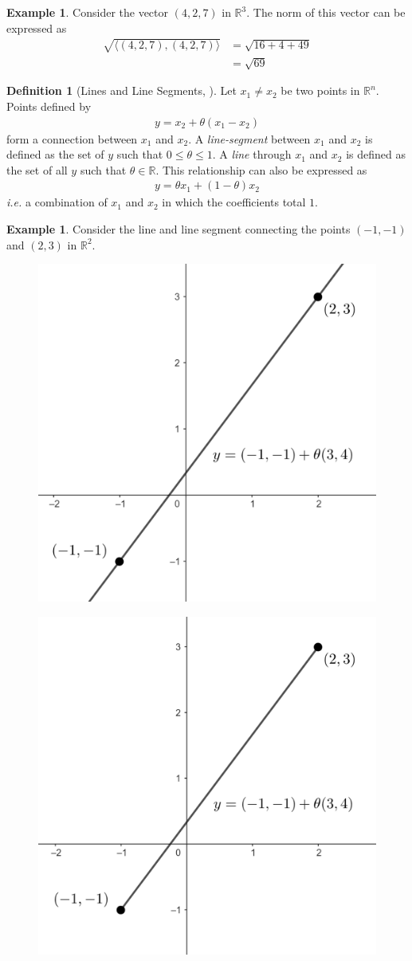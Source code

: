 \documentclass[11pt,reqno]{amsart}
\newcommand{\R}{\mathbb{R}}
\theoremstyle{plain}
\theoremstyle{definition}
\newtheorem{example}[theorem]{Example}
\newtheorem{definition}[theorem]{Definition}
\begin{document}
{\smallskip
\begin{example}
    Consider the vector $(4, 2, 7)$ in $\R^3$. The norm of this vector can be expressed as
    \begin{align*}
        \sqrt{\langle(4,2,7),(4,2,7)\rangle}&= \sqrt{16+4+49}\\
        &= \sqrt{69}
    \end{align*}
\end{example}
\smallskip
\begin{definition}[{Lines and Line Segments, \cite[2.1.1]{boyd_vandenberghe_2004}}]
    Let $x_1 \neq x_2$ be two points in $\R^n$. Points defined by
    \begin{align*}
        y = x_2 + \theta(x_1 - x_2)
    \end{align*}
    form a connection between $x_1$ and $x_2$. A \emph{line-segment} between $x_1$ and $x_2$ is defined as the set of $y$ such that $0 \leq \theta \leq 1$. A \emph{line} through $x_1$ and $x_2$ is defined as the set of all $y$ such that $\theta \in \R$. This relationship can also be expressed as
    \begin{align*}
        y = \theta x_1 + (1 - \theta)x_2
    \end{align*}
    \emph{i.e.} a combination of $x_1$ and $x_2$ in which the coefficients total $1$.
\end{definition}
\smallskip
\begin{example}
    Consider the line and line segment connecting the points $(-1,-1)$ and $(2,3)$ in $\R^2$.
    \begin{figure}[h]
    \centering
    \begin{minipage}{.5\textwidth}
      \centering
      \includegraphics[height = 1.7 in]{Line.png}
      \label{fig:test1}
    \end{minipage}%
    \begin{minipage}{.5\textwidth}
      \centering
      \includegraphics[height = 1.7 in]{segment.png}

\end{minipage}
\end{figure}
\end{example}}
\end{document}

